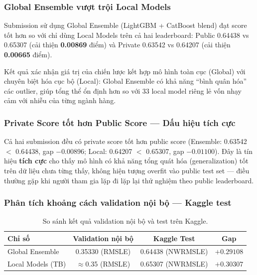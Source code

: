 \documentclass[12pt,a4paper]{report}
\begin{document}
\subsubsection{Global Ensemble vượt trội Local Models}

Submission sử dụng Global Ensemble (LightGBM + CatBoost blend) đạt score tốt hơn so với chỉ dùng Local Models trên cả hai leaderboard: Public 0.64438 vs 0.65307 (cải thiện \textbf{0.00869} điểm) và Private 0.63542 vs 0.64207 (cải thiện \textbf{0.00665} điểm).

Kết quả xác nhận giá trị của chiến lược kết hợp mô hình toàn cục (Global) với chuyên biệt hóa cục bộ (Local): Global Ensemble có khả năng ``bình quân hóa'' các outlier, giúp tổng thể ổn định hơn so với 33 local model riêng lẻ vốn nhạy cảm với nhiễu của từng ngành hàng.

\subsubsection{Private Score tốt hơn Public Score --- Dấu hiệu tích cực}

Cả hai submission đều có private score tốt hơn public score (Ensemble: 0.63542 $<$ 0.64438, gap $-0.00896$; Local: 0.64207 $<$ 0.65307, gap $-0.01100$). Đây là tín hiệu \textbf{tích cực} cho thấy mô hình có khả năng tổng quát hóa (generalization) tốt trên dữ liệu chưa từng thấy, không hiện tượng overfit vào public test set --- điều thường gặp khi người tham gia lặp đi lặp lại thử nghiệm theo public leaderboard.

\subsubsection{Phân tích khoảng cách validation nội bộ --- Kaggle test}

\begin{table}[h!]
\centering
\begin{tabular}{@{}lccc@{}}
\toprule
\textbf{Chỉ số} & \textbf{Validation nội bộ} & \textbf{Kaggle Test} & \textbf{Gap} \\
\midrule
Global Ensemble & 0.35330 (RMSLE) & 0.64438 (NWRMSLE) & $+0.29108$ \\
Local Models (TB) & $\approx$0.35 (RMSLE) & 0.65307 (NWRMSLE) & $+0.30307$ \\
\bottomrule
\end{tabular}
\caption{So sánh kết quả validation nội bộ và test trên Kaggle.}
\label{tab:gap}
\end{table}
\end{document}
